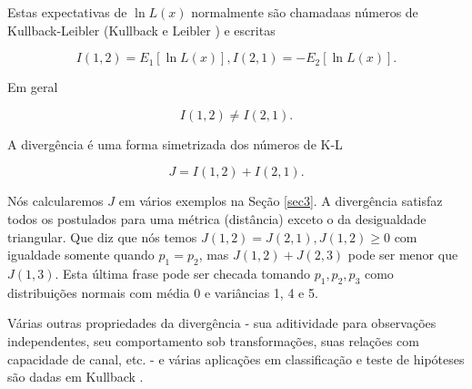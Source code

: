 \documentclass{sbrt2017port}
\begin{document}
Estas expectativas de $\ln L(x)$ normalmente são chamadaas números de Kullback-Leibler (Kullback e Leibler \cite {r17}) e escritas

\begin{equation}
 I(1,2) = E_1[\ln L(x)], I(2,1) = -E_2[\ln L(x)].
 \label{eq3}
\end{equation}

Em geral 

\begin{equation}
 I(1,2) \neq I(2,1).
 \label{eq4}
\end{equation}

A divergência é uma forma simetrizada dos números de K-L

\begin{equation}
 J = I(1,2) + I(2,1).
 \label{eq5}
\end{equation}

Nós calcularemos $J$ em vários exemplos na Seção \ref{sec3}. A divergência satisfaz todos os postulados para uma métrica (distância) exceto o da desigualdade triangular. Que diz que nós temos $J(1,2) = J(2,1), J(1,2) \geq 0 $ com igualdade somente quando $p_1 = p_2$, mas $J(1,2) + J(2,3)$ pode ser menor que $J(1,3)$. Esta última frase pode ser checada tomando $p_1, p_2, p_3$ como distribuições normais com média 0 e variâncias 1, 4 e 5.

Várias outras propriedades da divergência - sua aditividade para observações independentes, seu comportamento sob transformações, suas relações com capacidade de canal, etc. - e várias aplicações em classificação e teste de hipóteses são dadas em Kullback \cite{r8}.
\end{document}
